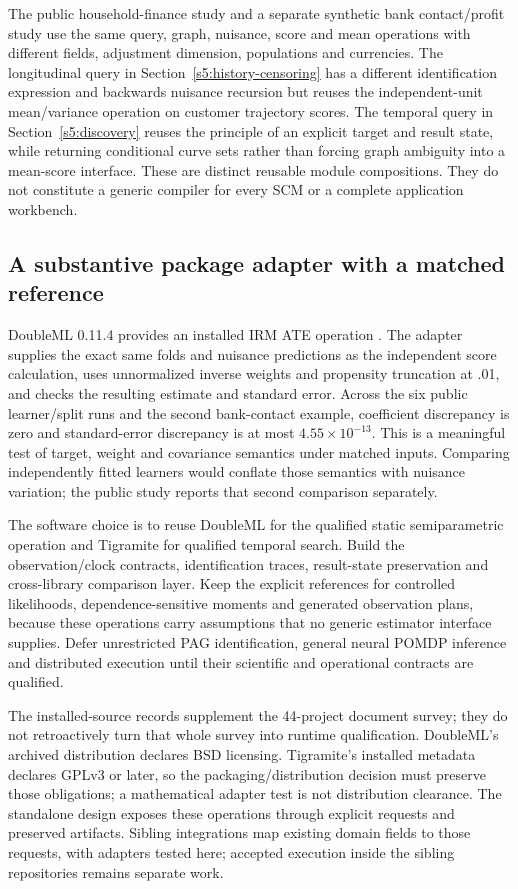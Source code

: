 The public household-finance study and a separate synthetic bank contact/profit
study use the same query, graph, nuisance, score and mean operations with
different fields, adjustment dimension, populations and currencies. The
longitudinal query in Section~\ref{s5:history-censoring} has a different
identification expression and backwards nuisance recursion but reuses the
independent-unit mean/variance operation on customer trajectory scores.
The temporal query in Section~\ref{s5:discovery} reuses the principle of an
explicit target and result state, while returning conditional curve sets
rather than forcing graph ambiguity into a mean-score interface. These are
distinct reusable module compositions. They do not constitute a generic
compiler for every SCM or a complete application workbench.

\subsection{A substantive package adapter with a matched reference}
DoubleML 0.11.4 provides an installed IRM ATE operation
\citep{doubleml2022,runtime_doubleml_scope}. The adapter supplies the exact
same folds and nuisance predictions as the independent score calculation,
uses unnormalized inverse weights and propensity truncation at .01, and
checks the resulting estimate and standard error. Across the six public
learner/split runs and the second bank-contact example, coefficient
discrepancy is zero and standard-error discrepancy is at most
$4.55\times10^{-13}$. This is a meaningful test of target, weight and
covariance semantics under matched inputs. Comparing independently fitted
learners would conflate those semantics with nuisance variation; the public
study reports that second comparison separately.

The software choice is to reuse DoubleML for the qualified static
semiparametric operation and Tigramite for qualified temporal search. Build
the observation/clock contracts, identification traces, result-state
preservation and cross-library comparison layer. Keep the explicit references
for controlled likelihoods, dependence-sensitive moments and generated
observation plans, because these operations carry assumptions that no
generic estimator interface supplies. Defer unrestricted PAG identification,
general neural POMDP inference and distributed execution until their
scientific and operational contracts are qualified.

The installed-source records supplement the 44-project document survey;
they do not retroactively turn that whole survey into runtime qualification.
DoubleML's archived distribution declares BSD licensing. Tigramite's
installed metadata declares GPLv3 or later, so the packaging/distribution
decision must preserve those obligations; a mathematical adapter test is
not distribution clearance. The standalone design exposes these operations
through explicit requests and preserved artifacts. Sibling integrations
map existing domain fields to those requests, with adapters tested here;
accepted execution inside the sibling repositories remains separate work.

